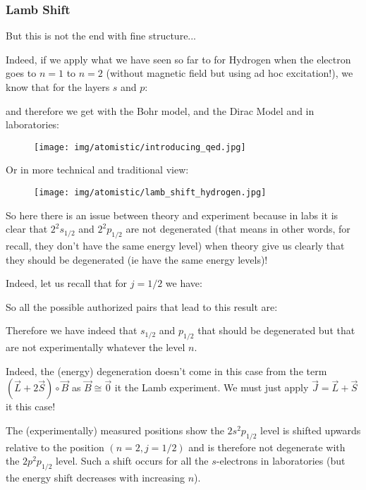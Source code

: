 	\subsubsection{Lamb Shift}
	But this is not the end with fine structure...
	
	Indeed, if we apply what we have seen so far to for Hydrogen when the electron goes to $n=1$ to $n=2$ (without magnetic field but using ad hoc excitation!), we know that for the layers $s$ and $p$:
	
	and therefore we get with the Bohr model, and the Dirac Model and in laboratories:
	\begin{figure}[H]
		\centering
		\texttt{[image: img/atomistic/introducing\_qed.jpg]}
	\end{figure}
	Or in more technical and traditional view:
	\begin{figure}[H]
		\centering
		\texttt{[image: img/atomistic/lamb\_shift\_hydrogen.jpg]}
	\end{figure}
	So here there is an issue between theory and experiment because in labs it is clear that $2^2s_{1/2}$ and $2^2p_{1/2}$ are not degenerated (that means in other words, for recall, they don't have the same energy level) when theory give us clearly that they should be degenerated (ie have the same energy levels)!

	Indeed, let us recall that for $j=1/2$ we have:
	
	So all the possible authorized pairs that lead to this result are:
	
	Therefore we have indeed that $s_{1/2}$ and $p_{1/2}$ that should be degenerated but that are not experimentally whatever the level $n$. 

	Indeed, the (energy) degeneration doesn't come in this case from the term $(\vec{L}+2\vec{S})\circ\vec{B}$ as $\vec{B}\cong \vec{0}$ it the Lamb experiment. We must just apply $\vec{J}=\vec{L}+\vec{S}$ it this case!
	
	The (experimentally) measured positions show the $2s^2p_{1/2}$ level is shifted upwards relative to the position $(n=2,j=1/2)$ and is therefore not degenerate with the $2p^2p_{1/2}$ level. Such a shift occurs for all the $s$-electrons in laboratories (but the energy shift decreases with increasing $n$). 
	
